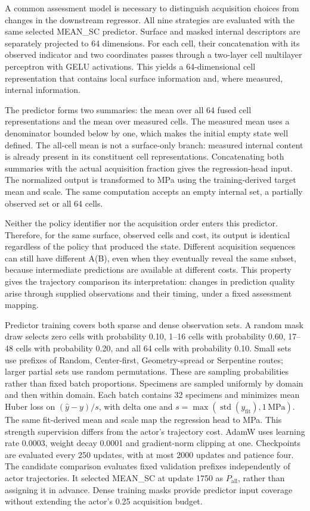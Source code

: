 A common assessment model is necessary to distinguish acquisition choices from changes in the downstream regressor. All nine strategies are evaluated with the same selected MEAN\_SC predictor. Surface and masked internal descriptors are separately projected to 64 dimensions. For each cell, their concatenation with its observed indicator and two coordinates passes through a two-layer cell multilayer perceptron with GELU activations. This yields a 64-dimensional cell representation that contains local surface information and, where measured, internal information.

The predictor forms two summaries: the mean over all 64 fused cell representations and the mean over measured cells. The measured mean uses a denominator bounded below by one, which makes the initial empty state well defined. The all-cell mean is not a surface-only branch: measured internal content is already present in its constituent cell representations. Concatenating both summaries with the actual acquisition fraction gives the regression-head input. The normalized output is transformed to MPa using the training-derived target mean and scale. The same computation accepts an empty internal set, a partially observed set or all 64 cells.

Neither the policy identifier nor the acquisition order enters this predictor. Therefore, for the same surface, observed cells and cost, its output is identical regardless of the policy that produced the state. Different acquisition sequences can still have different A(B), even when they eventually reveal the same subset, because intermediate predictions are available at different costs. This property gives the trajectory comparison its interpretation: changes in prediction quality arise through supplied observations and their timing, under a fixed assessment mapping.

Predictor training covers both sparse and dense observation sets. A random mask draw selects zero cells with probability 0.10, 1--16 cells with probability 0.60, 17--48 cells with probability 0.20, and all 64 cells with probability 0.10. Small sets use prefixes of Random, Center-first, Geometry-spread or Serpentine routes; larger partial sets use random permutations. These are sampling probabilities rather than fixed batch proportions. Specimens are sampled uniformly by domain and then within domain. Each batch contains 32 specimens and minimizes mean Huber loss on \((\hat{y}-y)/s\), with delta one and \(s=\max(\operatorname{std}(y_{\mathrm{fit}}),1\,\mathrm{MPa})\). The same fit-derived mean and scale map the regression head to MPa. This strength supervision differs from the actor's trajectory cost. AdamW uses learning rate 0.0003, weight decay 0.0001 and gradient-norm clipping at one. Checkpoints are evaluated every 250 updates, with at most 2000 updates and patience four. The candidate comparison evaluates fixed validation prefixes independently of actor trajectories. It selected MEAN\_SC at update 1750 as \(P_{\mathrm{all}}\), rather than assigning it in advance. Dense training masks provide predictor input coverage without extending the actor's 0.25 acquisition budget.

